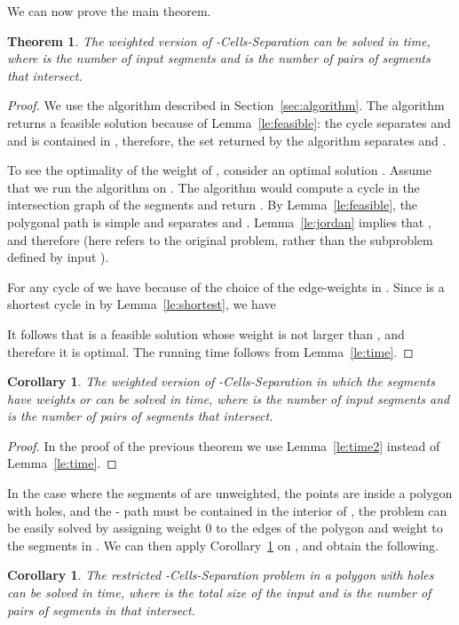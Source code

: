 \documentclass[11pt,a4paper]{article}
\newtheorem{theorem}[definition]{Theorem}
\newtheorem{corollary}[definition]{Corollary}
\begin{document}
We can now prove the main theorem.
\begin{theorem}\label{thm:separation}
	The weighted version of {-Cells-Separation} can be solved in  time,
	where  is the number of input segments and  is the number of pairs of segments that intersect.
\end{theorem}
\begin{proof}
	We use the algorithm described in Section~\ref{sec:algorithm}.
	The algorithm returns a feasible solution because of Lemma~\ref{le:feasible}:
	the cycle  separates  and  and
	is contained in , therefore, 
	the set  returned by the algorithm separates  and .
	
	To see the optimality of the weight of , consider an optimal solution .
	Assume that we run the algorithm on .
	The algorithm would compute a cycle  in the intersection graph of the segments 
	and return . By Lemma~\ref{le:feasible},
	the polygonal path  is simple and separates  and .
	Lemma~\ref{le:jordan} implies that ,
	and therefore  (here  refers to the original problem, rather than the subproblem
	defined by input ).
	
	For any cycle  of  we have  because of the choice of the edge-weights in . 
	Since  is a shortest cycle in  by Lemma~\ref{le:shortest},
	we have
	
	It follows that  is a feasible solution whose weight is not larger than ,
	and therefore it is optimal.
	The running time follows from Lemma~\ref{le:time}.
\end{proof}


\begin{corollary}\label{co:separation}
	The weighted version of {\sc -Cells-Separation} in which the segments have weights  or  
	can be solved in  time,
	where  is the number of input segments and  is the number of pairs of segments that intersect.
\end{corollary}
\begin{proof}
	In the proof of the previous theorem we use Lemma~\ref{le:time2} instead of Lemma~\ref{le:time}.
\end{proof}

In the case where the segments of  are unweighted, the points  are inside a polygon  with holes, and the - path must be contained in the interior of , the problem can be easily solved by 
assigning weight 0 to the edges  of the polygon 
and weight  to the segments in . 
We can then apply Corollary~\ref{co:separation} on , and obtain the following.

\begin{corollary}
The restricted {\sc -Cells-Separation} problem in a polygon with holes can be solved in  time, where  is the total size of the input
and  is the number of pairs of segments in  that intersect.
\end{corollary}
\end{document}
